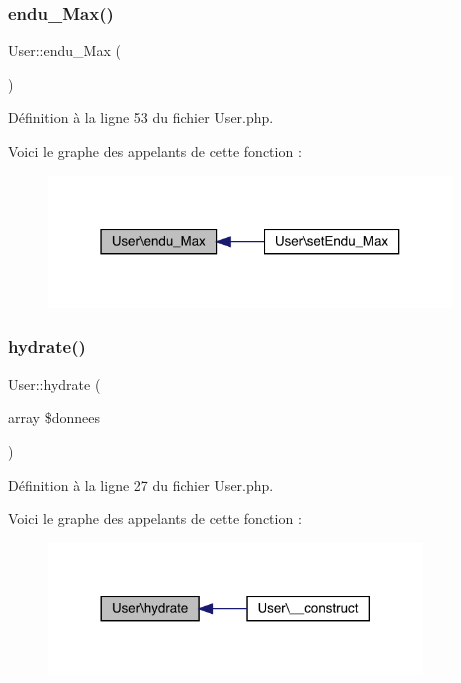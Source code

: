 \subsubsection{\texorpdfstring{endu\+\_\+\+Max()}{endu\_Max()}}
{\footnotesize\ttfamily User\+::endu\+\_\+\+Max (\begin{DoxyParamCaption}{ }\end{DoxyParamCaption})}



Définition à la ligne 53 du fichier User.\+php.

Voici le graphe des appelants de cette fonction \+:\nopagebreak
\begin{figure}[H]
\begin{center}
\leavevmode
\includegraphics[width=304pt]{class_user_a3c4f83665c4b093ac23cb1ef8c962b4e_icgraph}
\end{center}
\end{figure}
\mbox{\label{class_user_a6a8c32b1e008d4bbda256614aea7e21b}} 
\subsubsection{\texorpdfstring{hydrate()}{hydrate()}}
{\footnotesize\ttfamily User\+::hydrate (\begin{DoxyParamCaption}\item[{array}]{\$donnees }\end{DoxyParamCaption})}



Définition à la ligne 27 du fichier User.\+php.

Voici le graphe des appelants de cette fonction \+:\nopagebreak
\begin{figure}[H]
\begin{center}
\leavevmode
\includegraphics[width=281pt]{class_user_a6a8c32b1e008d4bbda256614aea7e21b_icgraph}
\end{center}
\end{figure}
\mbox{\label{class_user_acca0b7b0795d518d884a25505add943c}} 
